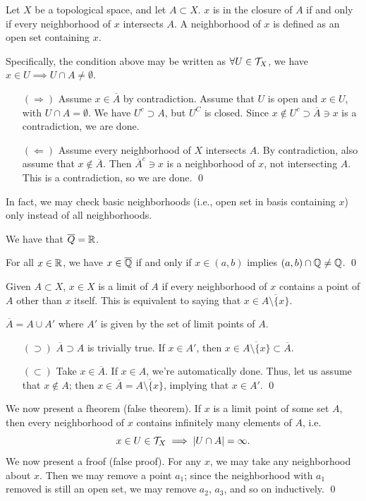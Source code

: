 \newpage
\begin{simplethm}
    Let $X$ be a topological space, and let $A \subset X$. $x$ is in the closure of $A$ if and only if every neighborhood of $x$ intersects $A$. A neighborhood of $x$ is defined as an open set containing $x$.
\end{simplethm}
\noindent Specifically, the condition above may be written as $\forall U \in \mathcal T_X$, we have $x \in U \implies U \cap A \neq \emptyset$.
\begin{itemize}
    \item[$(\Rightarrow)$] Assume $x \in \overline{A}$ by contradiction. Assume that $U$ is open and $x \in U$, with $U \cap A = \emptyset$. We have $U^c \supset A$, but $U^C$ is closed. Since $x \not\in U^c \supset \overline{A} \ni x$ is a contradiction, we are done.
    \item[$(\Leftarrow)$] Assume every neighborhood of $X$ intersects $A$. By contradiction, also assume that $x \not\in \overline{A}$. Then $\overline{A}^c \ni x$ is a neighborhood of $x$, not intersecting $A$. This is a contradiction, so we are done. \qed
\end{itemize}
In fact, we may check basic neighborhoods (i.e., open set in basis containing $x$) only instead of all neighborhoods.

\begin{simpleclaim}[Closure of $\QQ$ is $\RR$]
    We have that $\overline{Q} = \mathbb R$.
\end{simpleclaim}
\noindent For all $x \in \mathbb R$, we have $x \in \overline{\mathbb Q}$ if and only if $x \in (a, b)$ implies $(a, b) \cap \mathbb Q \neq \mathbb Q$. \qed

\begin{definition}
    Given $A \subset X$, $x \in X$ is a limit of $A$ if every neighborhood of $x$ contains a point of $A$ other than $x$ itself. This is equivalent to saying that $x \in \overline{A \setminus \{x\}}$.
\end{definition}

\begin{simplethm}
    $\overline{A} = A \cup A'$ where $A'$ is given by the set of limit points of $A$.
\end{simplethm}
\begin{itemize}
    \item[$(\supset)$] $\overline{A} \supset A$ is trivially true. If $x \in A'$, then $x \in \overline{A \setminus \{x\}} \subset \overline{A}$.
    \item[$(\subset)$] Take $x \in \overline{A}$. If $x \in A$, we're automatically done. Thus, let us assume that $x \not\in A$; then $x \in \overline{A} = \overline{A \setminus \{x\}}$, implying that $x \in A'$. \qed
\end{itemize}
We now present a fheorem (false theorem). If $x$ is a limit point of some set $A$, then every neighborhood of $x$ contains infinitely many elements of $A$, i.e.
\[ x \in U \in \mathcal T_X \implies \left\lvert U \cap A \right\rvert = \infty. \]
We now present a froof (false proof). For any $x$, we may take any neighborhood about $x$. Then we may remove a point $a_1$; since the neighborhood with $a_1$ removed is still an open set, we may remove $a_2$, $a_3$, and so on inductively. \qed